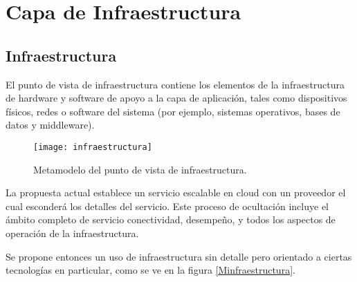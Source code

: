 
\chapter{Capa de Infraestructura}

\section{Infraestructura}


El punto de vista de infraestructura contiene los elementos de la infraestructura de hardware y software de apoyo a la capa de aplicación, tales como dispositivos físicos, redes o software del sistema (por ejemplo, sistemas operativos, bases de datos y middleware).

\begin{figure}[H]
\centering
\texttt{[image: infraestructura]}
\caption{Metamodelo del punto de vista de infraestructura.}
\end{figure}

La propuesta actual establece un servicio escalable en cloud con un proveedor el cual esconderá los detalles del servicio. Este proceso de ocultación incluye el ámbito completo de servicio conectividad, desempeño, y todos los aspectos de operación de la infraestructura.

Se propone entonces un uso de infraestructura sin detalle pero orientado a ciertas tecnologías en particular, como se ve en la figura \ref{Minfraestructura}.

